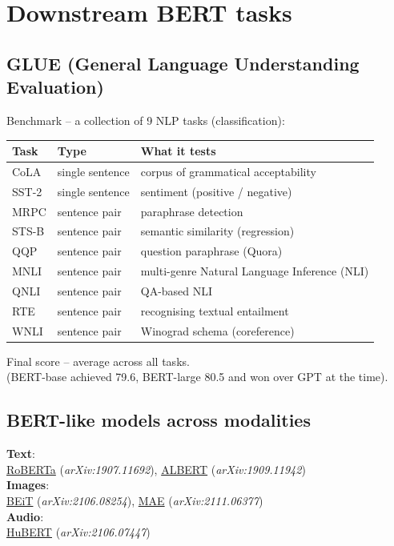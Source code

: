 \documentclass[10pt]{article}
\begin{document}
\section{Downstream BERT tasks}

\subsection*{GLUE (General Language Understanding Evaluation)} 
Benchmark -- a collection of 9 NLP tasks (classification):
 
\begin{center}
\begin{tabular}{llp{6cm}}
\toprule 
\textbf{Task} & \textbf{Type} & \textbf{What it tests} \\
\midrule
CoLA  & single sentence & corpus of grammatical acceptability \\
SST-2 & single sentence & sentiment (positive / negative) \\
MRPC  & sentence pair   & paraphrase detection \\
STS-B & sentence pair   & semantic similarity (regression) \\
QQP   & sentence pair   & question paraphrase (Quora) \\
MNLI  & sentence pair   &  \footnotesize{multi-genre Natural Language Inference (NLI)}\\
QNLI  & sentence pair   & QA-based NLI \\
RTE   & sentence pair   & recognising textual entailment \\
WNLI  & sentence pair   & Winograd schema (coreference) \\
\bottomrule
\end{tabular}
\end{center}

Final score -- average across all tasks. \\ (BERT-base achieved 79.6, BERT-large 80.5 and won over GPT at the time).


\subsection*{BERT-like models across modalities}

\textbf{Text}: \\
\href{https://arxiv.org/abs/1907.11692}{RoBERTa} (\textit{arXiv:1907.11692}),
\href{https://arxiv.org/abs/1909.11942}{ALBERT} (\textit{arXiv:1909.11942}) \\
\textbf{Images}: \\
\href{https://arxiv.org/abs/2106.08254}{BEiT} (\textit{arXiv:2106.08254}),
\href{https://arxiv.org/abs/2111.06377}{MAE} (\textit{arXiv:2111.06377}) \\
\textbf{Audio}: \\
\href{https://arxiv.org/abs/2106.07447}{HuBERT} (\textit{arXiv:2106.07447})
\end{document}

